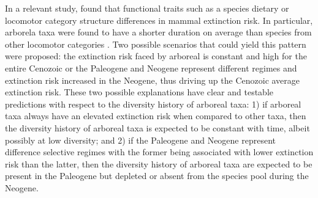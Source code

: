 \documentclass[12pt,letterpaper]{article}
\begin{document}
In a relevant study, \citet{Smits2015b} found that functional traits such as a species dietary or locomotor category structure differences in mammal extinction risk. In particular, arborela taxa were found to have a shorter duration on average than species from other locomotor categories \citep{Smits2015b}. Two possible scenarios that could yield this pattern were proposed: the extinction risk faced by arboreal is constant and high for the entire Cenozoic or the Paleogene and Neogene represent different regimes and extinction risk increased in the Neogene, thus driving up the Cenozoic average extinction risk. These two possible explanations have clear and testable predictions with respect to the diversity history of arboreal taxa: 1) if arboreal taxa always have an elevated extinction risk when compared to other taxa, then the diversity history of arboreal taxa is expected to be constant with time, albeit possibly at low diversity; and 2) if the Paleogene and Neogene represent difference selective regimes with the former being associated with lower extinction risk than the latter, then the diversity history of arboreal taxa are expected to be present in the Paleogene but depleted or absent from the species pool during the Neogene.

\end{document}
